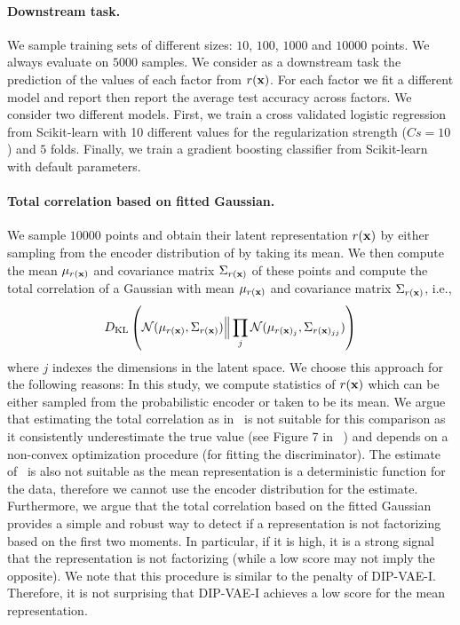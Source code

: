  \paragraph{Downstream task.} 
 We sample training sets of different sizes: $\num{10}$, $\num{100}$, $\num{1000}$ and $\num{10000}$ points. We always evaluate on $\num{5000}$ samples. We consider as a downstream task the prediction of the values of each factor from $r({\mathbf{x}})$. For each factor we fit a different model and report then report the average test accuracy across factors. We consider two different models. First, we train a cross validated logistic regression from Scikit-learn with 10 different values for the regularization strength ($Cs = 10$) and $5$ folds. Finally, we train a gradient boosting classifier from Scikit-learn with default parameters.
 
 \paragraph{Total correlation based on fitted Gaussian.}
 We sample $\num{10000}$ points and obtain their latent representation $r({\mathbf{x}})$ by either sampling from the encoder distribution of by taking its mean. We then compute the mean $\mu_{r({\mathbf{x}})}$ and covariance matrix $\Sigma_{r({\mathbf{x}})}$ of these points and compute the total correlation of a Gaussian with mean $\mu_{r({\mathbf{x}})}$ and covariance matrix $\Sigma_{r({\mathbf{x}})}$, i.e.,
 \begin{align*}
 D_{\mathrm{KL}}\left(\mathcal{N}(\mu_{r({\mathbf{x}})},\Sigma_{r({\mathbf{x}})})\Big\|\prod_{j}\mathcal{N}(\mu_{r({\mathbf{x}})_j},\Sigma_{r({\mathbf{x}})_{jj}})\right)
 \end{align*}
 where $j$ indexes the dimensions in the latent space.
 We choose this approach for the following reasons:
 In this study, we compute statistics of $r({\mathbf{x}})$ which can be either sampled from the probabilistic encoder or taken to be its mean. We argue that estimating the total correlation as in~\citep{kim2018disentangling} is not suitable for this comparison as it consistently underestimate the true value (see Figure 7 in ~\citep{kim2018disentangling}) and depends on a non-convex optimization procedure (for fitting the discriminator). The estimate of~\citep{chen2018isolating} is also not suitable as the mean representation is a deterministic function for the data, therefore we cannot use the encoder distribution for the estimate. 
 Furthermore, we argue that the total correlation based on the fitted Gaussian provides a simple and robust way to detect if a representation is not factorizing based on the first two moments.
 In particular, if it is high, it is a strong signal that the representation is not factorizing (while a low score may not imply the opposite). 
 We note that this procedure is similar to the penalty of DIP-VAE-I. Therefore, it is not surprising that DIP-VAE-I achieves a low score for the mean representation.
\clearpage
